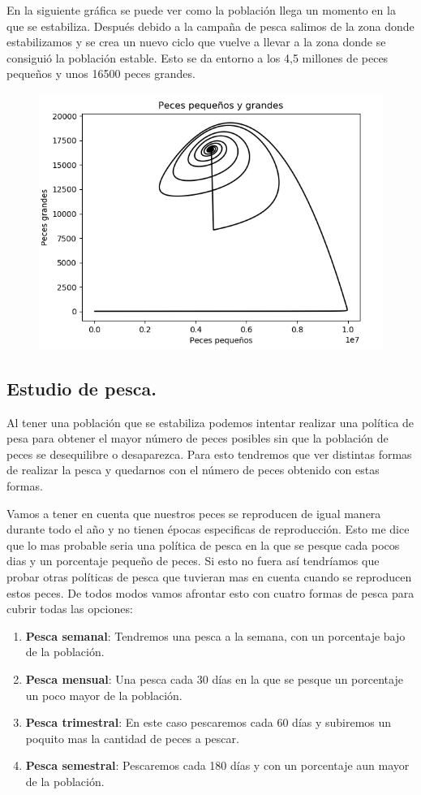 \documentclass[]{article}
\begin{document}
En la siguiente gráfica se puede ver como la población llega un momento en la que se estabiliza. Después debido a la campaña de pesca salimos de la zona donde estabilizamos y se crea un nuevo ciclo que vuelve a llevar a la zona donde se consiguió la población estable. Esto se da entorno a los 4,5 millones de peces pequeños y unos 16500 peces grandes.
\begin{figure}[H]
	\centering
	\includegraphics[width=0.7\linewidth]{img/screenshot0031}
	\caption{}
	\label{fig:screenshot0031}
\end{figure}




\subsection{Estudio de pesca.}
Al tener una población que se estabiliza podemos intentar realizar una política de pesa para obtener el mayor número de peces posibles sin que la población de peces se desequilibre o desaparezca. Para esto tendremos que ver distintas formas de realizar la pesca y quedarnos con el número de peces obtenido con estas formas.

 Vamos a tener en cuenta que nuestros peces se reproducen de igual manera durante todo el año y no tienen épocas especificas de reproducción. Esto me dice que lo mas probable seria una política de pesca en la que se pesque cada pocos dias y un porcentaje pequeño de peces. Si esto no fuera así tendríamos que probar otras políticas de pesca que tuvieran mas en cuenta cuando se reproducen estos peces. De todos modos vamos afrontar esto con cuatro formas de pesca para cubrir todas las opciones:
\newpage
\begin{enumerate}
	\item \textbf{Pesca semanal}: Tendremos una pesca a la semana, con un porcentaje bajo de la población. 
	\item \textbf{Pesca mensual}: Una pesca cada 30 días en la que se pesque un porcentaje un poco mayor de la población. 
	\item \textbf{Pesca trimestral}: En este caso pescaremos cada 60 días y subiremos un poquito mas la cantidad de peces a pescar.
	\item \textbf{Pesca semestral}: Pescaremos cada 180 días y con un porcentaje aun mayor de la población.
\end{enumerate}
\end{document}
